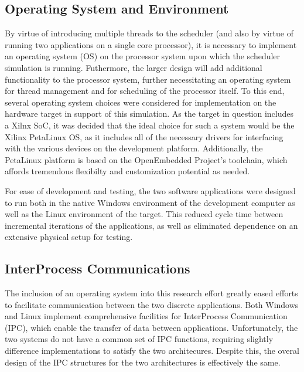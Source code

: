 \subsection{Operating System and Environment}\label{subsec:LinuxImpl}
By virtue of introducing multiple threads to the scheduler (and also by virtue of running two applications on a single core processor), it is necessary to implement an operating system (OS) on the processor system upon which the scheduler simulation is running. Futhermore, the larger design will add additional functionality to the processor system, further necessitating an operating system for thread management and for scheduling of the processor itself. To this end, several operating system choices were considered for implementation on the hardware target in support of this simulation. As the target in question includes a Xilnx SoC, it was decided that the ideal choice for such a system would be the Xilinx PetaLinux OS, as it includes all of the necessary drivers for interfacing with the various devices on the development platform. Additionally, the PetaLinux platform is based on the OpenEmbedded Project's toolchain, which affords tremendous flexibilty and customization potential as needed.

For ease of development and testing, the two software applications were designed to run both in the native Windows environment of the development computer as well as the Linux environment of the target. This reduced cycle time between incremental iterations of the applications, as well as eliminated dependence on an extensive physical setup for testing.

\subsection{InterProcess Communications}\label{subsec:IPC}
The inclusion of an operating system into this research effort greatly eased efforts to facilitate communication between the two discrete applications. Both Windows and Linux implement comprehensive facilities for InterProcess Communication (IPC), which enable the transfer of data between applications. Unfortunately, the two systems do not have a common set of IPC functions, requiring slightly difference implementations to satisfy the two architecures. Despite this, the overal design of the IPC structures for the two architectures is effectively the same.

